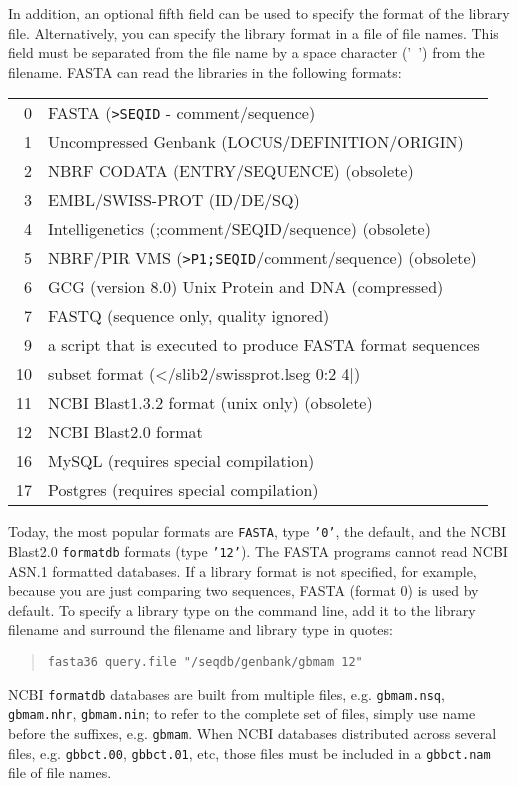 \documentclass[11pt]{article}
\begin{document}
In addition, an optional fifth field can be used to specify the format
of the library file.  Alternatively, you can specify the library
format in a file of file names.  This field must be separated from the
file name by a space character ('\ ') from the filename.  FASTA can
read the libraries in the following formats:\\

\begin{tabular}{r l}
0 & FASTA (\texttt{>SEQID} - comment/sequence) \\
1 & Uncompressed Genbank (LOCUS/DEFINITION/ORIGIN)\\
2 & NBRF CODATA (ENTRY/SEQUENCE) (obsolete)\\
3 & EMBL/SWISS-PROT (ID/DE/SQ)\\
4 & Intelligenetics (;comment/SEQID/sequence) (obsolete)\\
5 & NBRF/PIR VMS (\texttt{>P1;SEQID}/comment/sequence) (obsolete)\\
6 & GCG (version 8.0) Unix Protein and DNA (compressed)\\
7 & FASTQ (sequence only, quality ignored)\\
9 & a script that is executed to produce FASTA format sequences \\ 
10 & subset format (</slib2/swissprot.lseg 0:2 4|) \\
11 & NCBI Blast1.3.2 format  (unix only) (obsolete)\\
12 & NCBI Blast2.0 format\\
16 & MySQL (requires special compilation) \\
17 & Postgres (requires special compilation) \\
\end{tabular}

Today, the most popular formats are \texttt{FASTA}, type \texttt{'0'},
the default, and the NCBI Blast2.0 \texttt{formatdb} formats (type
\texttt{'12'}).  The FASTA programs cannot read NCBI ASN.1 formatted databases.
If a library format is not specified, for example, because
you are just comparing two sequences, FASTA (format 0) is used by
default. To specify a library type on the command line, add it to the
library filename and surround the filename and library type in quotes:
\begin{quote}
\begin{verbatim}
fasta36 query.file "/seqdb/genbank/gbmam 12"
\end{verbatim}
\end{quote}
NCBI \texttt{formatdb} databases are built from multiple files,
e.g. \texttt{gbmam.nsq}, \texttt{gbmam.nhr}, \texttt{gbmam.nin}; to
refer to the complete set of files, simply use name before the
suffixes, e.g. \texttt{gbmam}.  When NCBI databases distributed across
several files, e.g. \texttt{gbbct.00}, \texttt{gbbct.01}, etc, those
files must be included in a \texttt{gbbct.nam} file of file names.
\end{document}
